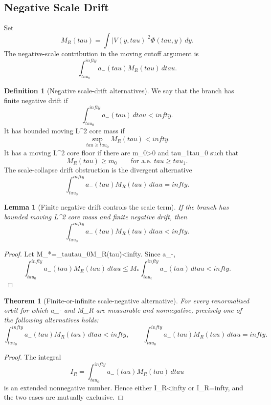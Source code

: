 \documentclass[11pt]{amsart}
\def\({}%
\def\){}%
\def\tau{tau}%
\def\infty{infty}%
\theoremstyle{plain}
\newtheorem{theorem}{Theorem}[section]
\newtheorem{lemma}[lemma]{Lemma}
\theoremstyle{definition}
\newtheorem{definition}[definition]{Definition}
\theoremstyle{remark}
\begin{document}
\subsection{Negative Scale Drift}

Set
\[
  M_R(\tau)=\int |V(y,\tau)|^2\Phi(\tau,y)\,dy .
\]
The negative-scale contribution in the moving cutoff argument is
\[
  \int_{\tau_0}^{\infty}a_-(\tau)M_R(\tau)\,d\tau.
\]

\begin{definition}[Negative scale-drift alternatives]\label{paper6a:def:negative-drift}
We say that the branch has finite negative drift if
\[
  \int_{\tau_0}^{\infty}a_-(\tau)\,d\tau<\infty.
\]
It has bounded moving \(L^2\) core mass if
\[
  \sup_{\tau\ge\tau_0}M_R(\tau)<\infty.
\]
It has a moving \(L^2\) core floor if there are \(m_0>0\) and
\(\tau_1\ge\tau_0\) such that
\[
  M_R(\tau)\ge m_0
  \qquad\text{for a.e. }\tau\ge\tau_1.
\]
The scale-collapse drift obstruction is the divergent alternative
\[
  \int_{\tau_0}^{\infty}a_-(\tau)M_R(\tau)\,d\tau=\infty .
\]
\end{definition}

\begin{lemma}[Finite negative drift controls the scale term]
\label{paper6a:lem:finite-negative-drift}
If the branch has bounded moving \(L^2\) core mass and finite negative drift,
then
\[
  \int_{\tau_0}^{\infty}a_-(\tau)M_R(\tau)\,d\tau<\infty .
\]
\end{lemma}

\begin{proof}
Let \(M_*=\sup_{\tau\ge\tau_0}M_R(\tau)<\infty\).  Since \(a_-\),
\[
  \int_{\tau_0}^{\infty}a_-(\tau)M_R(\tau)\,d\tau
  \le
  M_*\int_{\tau_0}^{\infty}a_-(\tau)\,d\tau<\infty.
\]
\end{proof}

\begin{theorem}[Finite-or-infinite scale-negative alternative]
\label{paper6a:thm:finite-infinite-scale-negative}
For every renormalized orbit for which \(a_-\) and \(M_R\) are measurable and
nonnegative, precisely one of the following alternatives holds:
\[
  \int_{\tau_0}^{\infty}a_-(\tau)M_R(\tau)\,d\tau<\infty,
  \qquad
  \int_{\tau_0}^{\infty}a_-(\tau)M_R(\tau)\,d\tau=\infty.
\]
\end{theorem}

\begin{proof}
The integral
\[
  I_R=\int_{\tau_0}^{\infty}a_-(\tau)M_R(\tau)\,d\tau
\]
is an extended nonnegative number.  Hence either \(I_R<\infty\) or
\(I_R=\infty\), and the two cases are mutually exclusive.
\end{proof}
\end{document}
